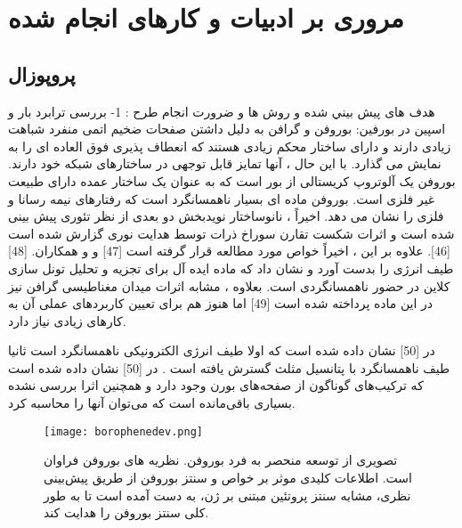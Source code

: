 \chapter{مروری بر ادبیات و کار‌های انجام شده}
\clearpage
\section{پروپوزال}
هدف های پيش بيني شده و روش ها و ضرورت انجام طرح :
1-	بررسی ترابرد بار و اسپین در بورفین:
بوروفن و گرافن به دلیل داشتن صفحات ضخیم اتمی منفرد شباهت زیادی دارند و دارای ساختار محکم زیادی هستند که انعطاف پذیری فوق العاده ای را به نمایش می گذارد. با این حال ، آنها تمایز قابل توجهی در ساختارهای شبکه خود دارند. بوروفن یک آلوتروپ کریستالی از بور است که به عنوان یک ساختار عمده دارای طبیعت غیر فلزی است. بوروفن ماده ای بسیار ناهمسانگرد است که رفتارهای نیمه رسانا و فلزی را نشان می دهد. اخیراً ، نانوساختار نویدبخش دو بعدی از نظر تئوری پیش بینی شده است و اثرات شکست تقارن سوراخ ذرات توسط هدایت نوری گزارش شده است [46]. علاوه بر این ، اخیراً خواص  مورد مطالعه قرار گرفته است [47] و  و همکاران. [48] طیف انرژی را بدست آورد و نشان داد که ماده ایده آل برای تجزیه و تحلیل تونل سازی کلاین در حضور ناهمسانگردی است. بعلاوه ، مشابه اثرات میدان مغناطیسی گرافن نیز در این ماده پرداخته شده است [49] اما هنوز هم برای تعیین کاربردهای عملی آن به کارهای زیادی نیاز دارد.

در [50] نشان داده شده است که اولا طیف انرژی الکترونیکی ناهمسانگرد است ثانیا طیف ناهمسانگرد با پتانسیل مثلث گسترش یافته است .
در [50] نشان داده شده‌ است که  ترکیب‌های گوناگون از صفحه‌های بورن وجود دارد و همچنین اثرا بررسی نشده بسیاری باقی‌مانده است که می‌توان آنها را محاسبه کرد.
\begin{figure*}[!ht]
    \centering
    \texttt{[image: borophenedev.png]}
    \caption{تصویری از توسعه منحصر به فرد بوروفن. نظریه های بوروفن فراوان است. اطلاعات کلیدی موثر بر خواص و سنتز بوروفن از طریق پیش‌بینی نظری، مشابه سنتز پروتئین مبتنی بر ژن، به دست آمده است تا به طور کلی سنتز بوروفن را هدایت کند.}
    \label{fig:borophenedev}
\end{figure*}
